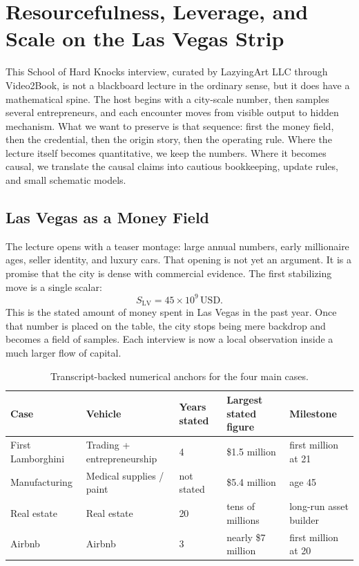 \chapter{Resourcefulness, Leverage, and Scale on the Las Vegas Strip}

This School of Hard Knocks interview, curated by LazyingArt LLC through Video2Book, is not a blackboard lecture in the ordinary sense, but it does have a mathematical spine. The host begins with a city-scale number, then samples several entrepreneurs, and each encounter moves from visible output to hidden mechanism. What we want to preserve is that sequence: first the money field, then the credential, then the origin story, then the operating rule. Where the lecture itself becomes quantitative, we keep the numbers. Where it becomes causal, we translate the causal claims into cautious bookkeeping, update rules, and small schematic models.

\section{Las Vegas as a Money Field}

The lecture opens with a teaser montage: large annual numbers, early millionaire ages, seller identity, and luxury cars. That opening is not yet an argument. It is a promise that the city is dense with commercial evidence. The first stabilizing move is a single scalar:
\begin{equation}
S_{\mathrm{LV}} = 45\times 10^9\,\mathrm{USD}.
\end{equation}
This is the stated amount of money spent in Las Vegas in the past year. Once that number is placed on the table, the city stops being mere backdrop and becomes a field of samples. Each interview is now a local observation inside a much larger flow of capital.

\begin{table}[h]
\centering
\begin{tabular}{|l|l|l|l|l|}
\hline
Case & Vehicle & Years stated & Largest stated figure & Milestone \\
\hline
First Lamborghini & Trading + entrepreneurship & 4 & \$1.5 million & first million at 21 \\
Manufacturing & Medical supplies / paint & not stated & \$5.4 million & age 45 \\
Real estate & Real estate & 20 & tens of millions & long-run asset builder \\
Airbnb & Airbnb & 3 & nearly \$7 million & first million at 20 \\
\hline
\end{tabular}
\caption{Transcript-backed numerical anchors for the four main cases.}
\end{table}

